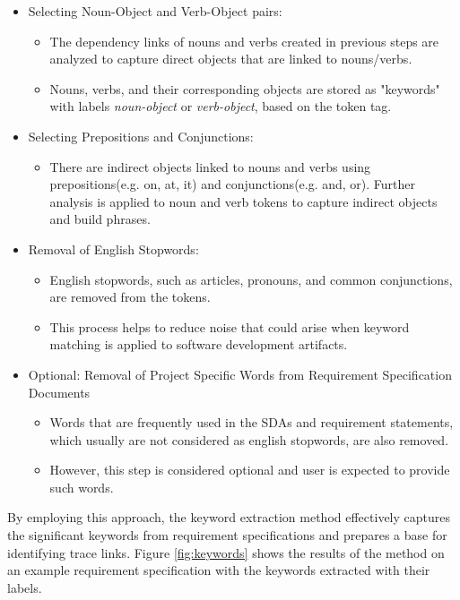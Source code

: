 \begin{itemize}
    \item Selecting Noun-Object and Verb-Object pairs:
        \begin{itemize}
            \item The dependency links of nouns and verbs created in previous steps are analyzed to capture direct objects that are linked to nouns/verbs.
            \item Nouns, verbs, and their corresponding objects are stored as "keywords" with labels \textit{noun-object} or \textit{verb-object}, based on the token tag.
        \end{itemize}
    \item Selecting Prepositions and Conjunctions:
        \begin{itemize}
            \item There are indirect objects linked to nouns and verbs using prepositions(e.g. on, at, it) and conjunctions(e.g. and, or). Further analysis is applied to noun and verb tokens to capture indirect objects and build phrases.
        \end{itemize}
    \item Removal of English Stopwords:
        \begin{itemize}
            \item English stopwords, such as articles, pronouns, and common conjunctions, are removed from the tokens.
            \item This process helps to reduce noise that could arise when keyword matching is applied to software development artifacts.
        \end{itemize}
    \item Optional: Removal of Project Specific Words from Requirement Specification Documents
        \begin{itemize}
            \item Words that are frequently used in the SDAs and requirement statements, which usually are not considered as english stopwords, are also removed.
            \item However, this step is considered optional and user is expected to provide such words.
        \end{itemize}
\end{itemize}

By employing this approach, the keyword extraction method effectively captures the significant keywords from requirement specifications and prepares a base for identifying trace links. Figure \ref{fig:keywords} shows the results of the method on an example requirement specification with the keywords extracted with their labels.

